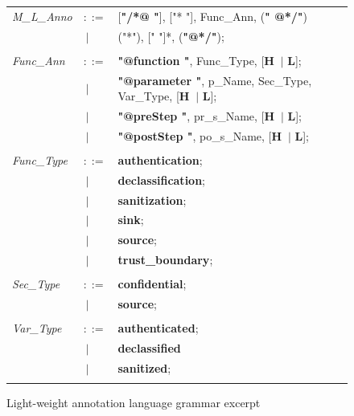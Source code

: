 \begin{figure}[ht!]
\begin{tabular}{lll}
		\textit{M\_L\_Anno}          &\footnotesize $::=$         &\footnotesize [\textbf{"/*@ "}],  ["* "],  Func\_Ann,  (\textbf{" @*/"}) \\
		&\footnotesize $\ \vert $    &\footnotesize ("*"), [" "]*, (\textbf{"@*/"});                  \\ \\
		\footnotesize        
		\textit{Func\_Ann}           &\footnotesize $::=$         &\footnotesize \textbf{"@function "},    Func\_Type,              [\textbf{H} $\ \vert $  \textbf{L}];     \\
		&\footnotesize $\ \vert $    &\footnotesize \textbf{"@parameter "},   p\_Name,  Sec\_Type, Var\_Type,    [\textbf{H} $\ \vert $  \textbf{L}];    \\
		&\footnotesize $\ \vert $    &\footnotesize \textbf{"@preStep "},     pr\_s\_Name,             [\textbf{H} $\ \vert $  \textbf{L}];    \\
		&\footnotesize $\ \vert $    &\footnotesize \textbf{"@postStep "},    po\_s\_Name,             [\textbf{H} $\ \vert $  \textbf{L}];    \\ \\                                        
		\footnotesize                       
		\textit{Func\_Type}          &\footnotesize $::=$        &\footnotesize \textbf{authentication};\\
		&\footnotesize $\ \vert $ &\footnotesize \textbf{declassification}; \\
		&\footnotesize $\ \vert $    &\footnotesize \textbf{sanitization};     \\
		&\footnotesize $\ \vert $    &\footnotesize \textbf{sink};             \\
		&\footnotesize $\ \vert $    &\footnotesize \textbf{source};           \\
		&\footnotesize $\ \vert $    &\footnotesize \textbf{trust\_boundary};  \\ \\
		\footnotesize                       
		\textit{Sec\_Type}           &\footnotesize $::=$         &\footnotesize \textbf{confidential}; \\
		&\footnotesize $\ \vert $    &\footnotesize \textbf{source};    \\ \\
		\footnotesize                       
		\textit{Var\_Type}           &\footnotesize $::=$         &\footnotesize \textbf{authenticated}; \\
		&\footnotesize $\ \vert $    &\footnotesize \textbf{declassified}
		\\
		&\footnotesize $\ \vert $    &\footnotesize \textbf{sanitized};    \\ \\	
		
	\end{tabular}
	\caption{Light-weight annotation language grammar excerpt}
	\label{language grammar}
\end{figure}


